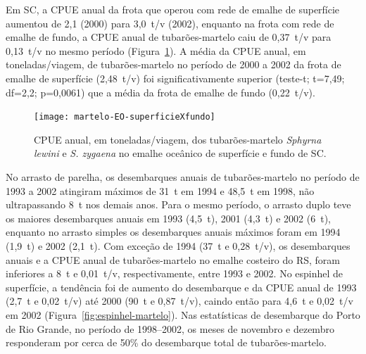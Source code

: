 \documentclass[a4paper,11pt,twoside,showtrims,onecolumn,openright,final]{memoir}
\begin{document}

Em SC, a CPUE anual da frota que operou com rede de emalhe de superfície 
aumentou de 2,1 (2000) para 3,0~t/v (2002), enquanto na frota com rede de emalhe de fundo, 
a CPUE anual de tubarões-martelo caiu de 0,37~t/v para 0,13~t/v no mesmo período (Figura~\ref{fig:emalhe-superXfundo-martelo}). %
A média da CPUE anual, em toneladas/viagem, de tubarões-martelo no período de 2000 a 2002 da frota de emalhe 
de superfície (2,48~t/v) foi significativamente superior (teste-t; t=7,49; df=2,2; p=0,0061) 
que a média da frota de emalhe de fundo (0,22~t/v).

%
%

\begin{figure}
\begin{center}
\texttt{[image: martelo-EO-superficieXfundo]}
\end{center}
\caption[CPUE anual dos tubarões-martelo no emalhe oceânico de superfície e fundo de SC.]
        {CPUE anual, em toneladas/viagem, dos tubarões-martelo \emph{Sphyrna lewini} e \emph{S. zygaena}
	 no emalhe oceânico de superfície e fundo de SC.}
\label{fig:emalhe-superXfundo-martelo}
\end{figure}


No arrasto de parelha, os desembarques anuais de tubarões-martelo no período de 1993 a 2002 
atingiram máximos de 31~t em 1994 e 48,5~t em 1998, não ultrapassando 8~t nos demais anos. 
Para o mesmo período, o arrasto duplo teve os maiores desembarques anuais em 1993 (4,5~t), 
2001 (4,3~t) e 2002 (6~t), enquanto no arrasto simples os desembarques anuais máximos 
foram em 1994 (1,9~t) e 2002 (2,1~t). Com exceção de 1994 (37~t e 0,28~t/v), os desembarques 
anuais e a CPUE anual de tubarões-martelo no emalhe costeiro do RS, foram inferiores a 8~t 
e 0,01~t/v, respectivamente, entre 1993 e 2002. No espinhel de superfície, a tendência foi 
de aumento do desembarque e da CPUE anual de 1993 (2,7~t e 0,02~t/v) até 2000 (90~t e 0,87~t/v), 
caindo então para 4,6~t e 0,02~t/v em 2002 (Figura~\ref{fig:espinhel-martelo}). %
Nas estatísticas de desembarque do Porto de Rio Grande, no período de 1998--2002, os meses
de novembro e dezembro responderam por cerca de 50\% do desembarque total de tubarões-martelo.
\end{document}
